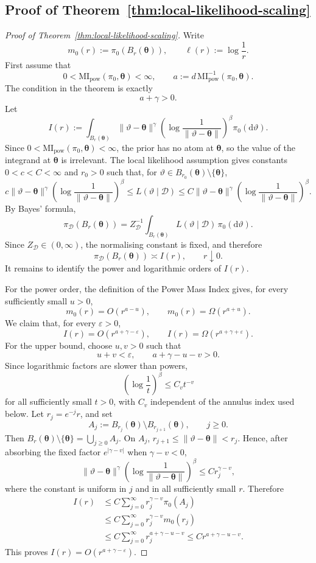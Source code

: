 \documentclass[11pt,a4paper]{article}
\newcommand{\MI}{\mathrm{MI}}
\newcommand{\pa}{\boldsymbol\theta}
\theoremstyle{compactplain}
\theoremstyle{compactdefinition}
\numberwithin{equation}{section}
\begin{document}
\subsection*{Proof of Theorem~\ref{thm:local-likelihood-scaling}}
\begin{proof}[Proof of Theorem~\ref{thm:local-likelihood-scaling}]
Write
\[
 m_0(r):=\pi_0(B_r(\pa)),
 \qquad
 \ell(r):=\log\frac1r .
\]
First assume that
\[
 0<\MI_{\mathrm{pow}}(\pi_0,\pa)<\infty,
 \qquad
 a:=d\,\MI_{\mathrm{pow}}^{-1}(\pi_0,\pa).
\]
The condition in the theorem is exactly
\[
 a+\gamma>0 .
\]
Let
\[
 I(r):=
 \int_{B_r(\pa)}
 \|\vartheta-\pa\|^\gamma
 \left(\log\frac1{\|\vartheta-\pa\|}\right)^\beta
 \pi_0(\mathrm d\vartheta).
\]
Since \(0<\MI_{\mathrm{pow}}(\pi_0,\pa)<\infty\), the prior has no atom at
\(\pa\), so the value of the integrand at \(\pa\) is irrelevant. The local
likelihood assumption gives constants \(0<c<C<\infty\) and \(r_0>0\) such that,
for \(\vartheta\in B_{r_0}(\pa)\setminus\{\pa\}\),
\[
 c\|\vartheta-\pa\|^\gamma
 \left(\log\frac1{\|\vartheta-\pa\|}\right)^\beta
 \le L(\vartheta\mid\mathcal D)
 \le C\|\vartheta-\pa\|^\gamma
 \left(\log\frac1{\|\vartheta-\pa\|}\right)^\beta .
\]
By Bayes' formula,
\[
 \pi_{\mathcal D}(B_r(\pa))
 =Z_{\mathcal D}^{-1}
 \int_{B_r(\pa)}L(\vartheta\mid\mathcal D)\,\pi_0(\mathrm d\vartheta).
\]
Since \(Z_{\mathcal D}\in(0,\infty)\), the normalising constant is fixed, and
therefore
\[
 \pi_{\mathcal D}(B_r(\pa))\asymp I(r),
 \qquad r\downarrow0 .
\]
It remains to identify the power and logarithmic orders of \(I(r)\).

For the power order, the definition of the Power Mass Index gives, for every
sufficiently small \(u>0\),
\[
 m_0(r)=O(r^{a-u}),
 \qquad
 m_0(r)=\Omega(r^{a+u}).
\]
We claim that, for every \(\varepsilon>0\),
\[
 I(r)=O(r^{a+\gamma-\varepsilon}),
 \qquad
 I(r)=\Omega(r^{a+\gamma+\varepsilon}).
\]
For the upper bound, choose \(u,v>0\) such that
\[
 u+v<\varepsilon,
 \qquad
 a+\gamma-u-v>0 .
\]
Since logarithmic factors are slower than powers,
\[
 \left(\log\frac1t\right)^\beta\le C_vt^{-v}
\]
for all sufficiently small \(t>0\), with \(C_v\) independent of the annulus
index used below. Let \(r_j=e^{-j}r\), and set
\[
 A_j:=B_{r_j}(\pa)\setminus B_{r_{j+1}}(\pa),
 \qquad j\ge0 .
\]
Then \(B_r(\pa)\setminus\{\pa\}=\bigcup_{j\ge0}A_j\). On \(A_j\),
\(r_{j+1}\le \|\vartheta-\pa\|<r_j\). Hence, after absorbing the fixed factor
\(e^{|\gamma-v|}\) when \(\gamma-v<0\),
\[
 \|\vartheta-\pa\|^\gamma
 \left(\log\frac1{\|\vartheta-\pa\|}\right)^\beta
 \le C r_j^{\gamma-v},
\]
where the constant is uniform in \(j\) and in all sufficiently small \(r\).
Therefore
\[
\begin{aligned}
 I(r)
 &\le C\sum_{j=0}^{\infty} r_j^{\gamma-v}\pi_0(A_j) \\
 &\le C\sum_{j=0}^{\infty} r_j^{\gamma-v}m_0(r_j) \\
 &\le C\sum_{j=0}^{\infty} r_j^{a+\gamma-u-v}
 \le C r^{a+\gamma-u-v}.
\end{aligned}
\]
This proves \(I(r)=O(r^{a+\gamma-\varepsilon})\).


\end{proof}
\end{document}
